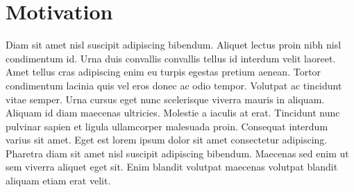 \chapter*{Motivation} 

Diam sit amet nisl suscipit adipiscing bibendum. Aliquet lectus proin nibh nisl condimentum id. Urna duis convallis convallis 
tellus id interdum velit laoreet. Amet tellus cras adipiscing enim eu turpis egestas pretium aenean. Tortor condimentum lacinia 
quis vel eros donec ac odio tempor. Volutpat ac tincidunt vitae semper. Urna cursus eget nunc scelerisque viverra mauris in aliquam. 
Aliquam id diam maecenas ultricies. Molestie a iaculis at erat. Tincidunt nunc pulvinar sapien et ligula ullamcorper malesuada proin. 
Consequat interdum varius sit amet. Eget est lorem ipsum dolor sit amet consectetur adipiscing. Pharetra diam sit amet nisl suscipit 
adipiscing bibendum. Maecenas sed enim ut sem viverra aliquet eget sit. Enim blandit volutpat maecenas volutpat blandit aliquam etiam 
erat velit.